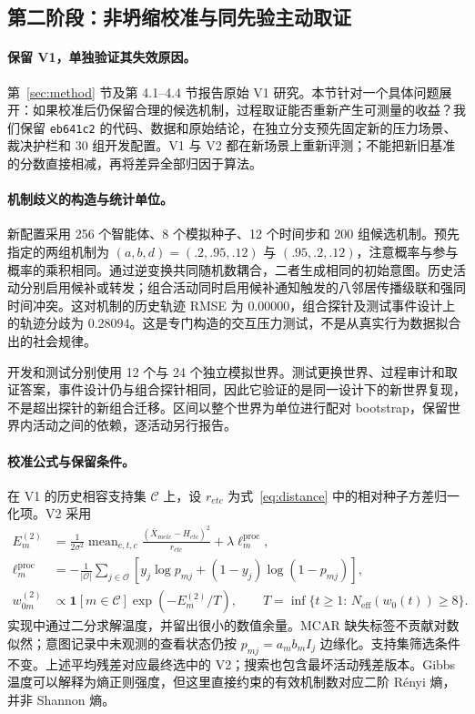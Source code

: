 \subsection{第二阶段：非坍缩校准与同先验主动取证}
\label{sec:round2}
\paragraph{保留 V1，单独验证其失效原因。}
第~\ref{sec:method} 节及第 4.1--4.4 节报告原始 V1 研究。本节针对一个具体问题展开：如果校准后仍保留合理的候选机制，过程取证能否重新产生可测量的收益？我们保留 \texttt{eb641c2} 的代码、数据和原始结论，在独立分支预先固定新的压力场景、裁决护栏和 30 组开发配置。V1 与 V2 都在新场景上重新评测；不能把新旧基准的分数直接相减，再将差异全部归因于算法。

\paragraph{机制歧义的构造与统计单位。}
新配置采用 256 个智能体、8 个模拟种子、12 个时间步和 200 组候选机制。预先指定的两组机制为 $(a,b,d)=(.2,.95,.12)$ 与 $(.95,.2,.12)$，注意概率与参与概率的乘积相同。通过逆变换共同随机数耦合，二者生成相同的初始意图。历史活动分别启用候补或转发；组合活动同时启用候补通知触发的八邻居传播级联和强同时间冲突。这对机制的历史轨迹 RMSE 为 0.00000，组合探针及测试事件设计上的轨迹分歧为 0.28094。这是专门构造的交互压力测试，不是从真实行为数据拟合出的社会规律。

开发和测试分别使用 12 个与 24 个独立模拟世界。测试更换世界、过程审计和取证答案，事件设计仍与组合探针相同，因此它验证的是同一设计下的新世界复现，不是超出探针的新组合迁移。区间以整个世界为单位进行配对 bootstrap，保留世界内活动之间的依赖，逐活动另行报告。

\paragraph{校准公式与保留条件。}
在 V1 的历史相容支持集 $\mathcal C$ 上，设 $r_{etc}$ 为式~\eqref{eq:distance} 中的相对种子方差归一化项。V2 采用
\begin{align}
 E_m^{(2)}&=\frac{1}{2\sigma^2}\operatorname{mean}_{e,t,c}
 \frac{(\bar X_{metc}-H_{etc})^2}{r_{etc}}+\lambda\ell_m^{\mathrm{proc}},\\
 \ell_m^{\mathrm{proc}}&=-\frac{1}{|\mathcal O|}\sum_{j\in\mathcal O}
 [y_j\log p_{mj}+(1-y_j)\log(1-p_{mj})],\\
 w_{0m}^{(2)}&\propto\mathbf1[m\in\mathcal C]\exp(-E_m^{(2)}/T),\qquad
 T=\inf\{t\geq1:\,N_{\mathrm{eff}}(w_0(t))\geq8\}.
 \label{eq:v2-calibration}
\end{align}
实现中通过二分求解温度，并留出很小的数值余量。MCAR 缺失标签不贡献对数似然；意图记录中未观测的查看状态仍按 $p_{mj}=a_mb_m I_j$ 边缘化。支持集筛选条件不变。上述平均残差对应最终选中的 V2；搜索也包含最坏活动残差版本。Gibbs 温度可以解释为熵正则强度，但这里直接约束的有效机制数对应二阶 R\'enyi 熵，并非 Shannon 熵。


